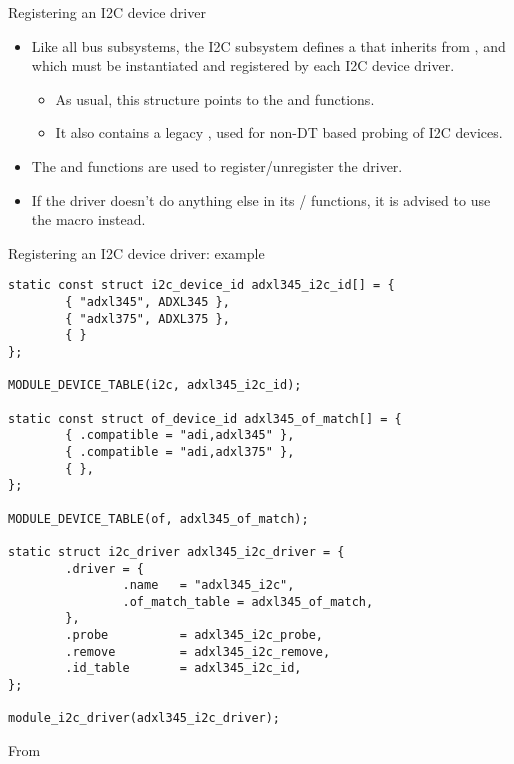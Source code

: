 \begin{frame}{Registering an I2C device driver}
  \begin{itemize}
  \item Like all bus subsystems, the I2C subsystem defines a
     that inherits from
    , and which must be instantiated and
    registered by each I2C device driver.
    \begin{itemize}
    \item As usual, this structure points to the  and
       functions.
    \item It also contains a legacy , used for non-DT based
      probing of I2C devices.
    \end{itemize}
  \item The  and  functions
    are used to register/unregister the driver.
  \item If the driver doesn't do anything else in its
    / functions, it is advised to use
    the  macro instead.
  \end{itemize}
\end{frame}

\begin{frame}[fragile]{Registering an I2C device driver: example}
  \begin{block}{}
  \begin{verbatim}
static const struct i2c_device_id adxl345_i2c_id[] = {
        { "adxl345", ADXL345 },
        { "adxl375", ADXL375 },
        { }
};

MODULE_DEVICE_TABLE(i2c, adxl345_i2c_id);

static const struct of_device_id adxl345_of_match[] = {
        { .compatible = "adi,adxl345" },
        { .compatible = "adi,adxl375" },
        { },
};

MODULE_DEVICE_TABLE(of, adxl345_of_match);

static struct i2c_driver adxl345_i2c_driver = {
        .driver = {
                .name   = "adxl345_i2c",
                .of_match_table = adxl345_of_match,
        },
        .probe          = adxl345_i2c_probe,
        .remove         = adxl345_i2c_remove,
        .id_table       = adxl345_i2c_id,
};

module_i2c_driver(adxl345_i2c_driver);
\end{verbatim}
\end{block}
\small
From 
\end{frame}

